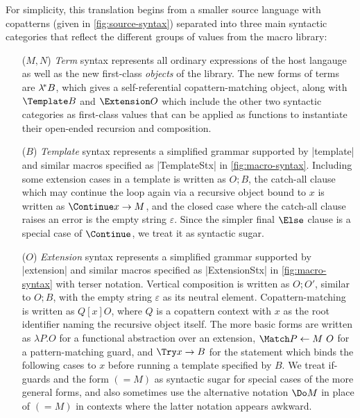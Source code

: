 For simplicity, this translation begins from a smaller source language with copatterns (given in \cref{fig:source-syntax}) separated into three main syntactic categories that reflect the different groups of values from the macro library:
\begin{itemize}
\item[($M, N$)] \emph{Term} syntax represents all ordinary expressions of the host langauge as well as the new first-class \emph{objects} of the library.
  The new forms of terms are $\lambda^{\!*} B$, which gives a self-referential copattern-matching object, along with $\Template B$ and $\Extension O$ which include the other two syntactic categories as first-class values that can be applied as functions to instantiate their open-ended recursion and composition.
\item[($B$)] \emph{Template} syntax represents a simplified grammar supported by \scm|template| and similar macros specified as \scm|TemplateStx| in \cref{fig:macro-syntax}.
  Including some extension cases in a template is written as $O; B$, the catch-all clause which may continue the loop again via a recursive object bound to $x$ is written as $\Continue x \to M$, and the closed case where the catch-all clause raises an error is the empty string $\varepsilon$.
  Since the simpler final $\Else$ clause is a special case of $\Continue$, we treat it as syntactic sugar.
\item[($O$)] \emph{Extension} syntax represents a simplified grammar supported by \scm|extension| and similar macros specified as \scm|ExtensionStx| in \cref{fig:macro-syntax} with terser notation.
  Vertical composition is written as $O; O'$, similar to $O; B$, with the empty string $\varepsilon$ as its neutral element.
  Copattern-matching is written as $Q[x] O$, where $Q$ is a copattern context with $x$ as the root identifier naming the recursive object itself.
  The more basic forms are written as $\lambda P. O$ for a functional abstraction over an extension, $\Match P \gets M ~ O$ for a pattern-matching guard, and $\Try x \to B$ for the statement which binds the following cases to $x$ before running a template specified by $B$.
  We treat if-guards and the form $(= M)$ as syntactic sugar for special cases of the more general forms, and also sometimes use the alternative notation $\Do M$ in place of $(= M)$ in contexts where the latter notation appears awkward.
\end{itemize}

